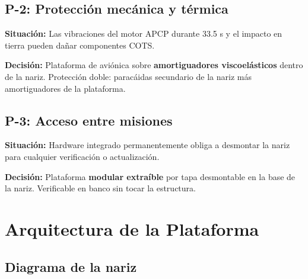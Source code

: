 \documentclass[11pt, a4paper]{article}
\begin{document}
\subsection{P-2: Protecci\'{o}n mec\'{a}nica y t\'{e}rmica}

\textbf{Situaci\'{o}n:} Las vibraciones del motor APCP durante 33.5 s y el impacto en tierra pueden da\~{n}ar componentes COTS.

\textbf{Decisi\'{o}n:} Plataforma de avi\'{o}nica sobre \textbf{amortiguadores viscoel\'{a}sticos} dentro de la nariz. Protecci\'{o}n doble: parac\'{a}idas secundario de la nariz m\'{a}s amortiguadores de la plataforma.

\subsection{P-3: Acceso entre misiones}

\textbf{Situaci\'{o}n:} Hardware integrado permanentemente obliga a desmontar la nariz para cualquier verificaci\'{o}n o actualizaci\'{o}n.

\textbf{Decisi\'{o}n:} Plataforma \textbf{modular extra\'{i}ble} por tapa desmontable en la base de la nariz. Verificable en banco sin tocar la estructura.

\section{Arquitectura de la Plataforma}

\subsection{Diagrama de la nariz}
\end{document}
